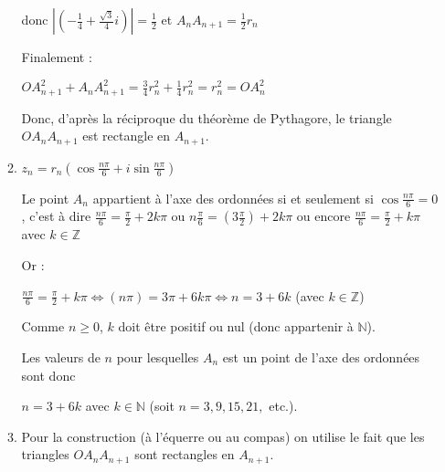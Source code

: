 \begin{corrige}
\begin{enumerate}
\begin{enumerate}[label=\alph*.]
               donc $\left| \left(-\frac{1}{4} + \frac{\sqrt{3}}{4}i\right) \right| = \frac{1}{2}$ et $A_{n}A_{n+1}=\frac{1}{2}r_{n}$
               \par
               Finalement :
               \par
               $ OA_{n+1}^{2} + A_{n}A_{n+1}^{2} = \frac{3}{4}r_{n}^{2}+\frac{1}{4}r_{n}^{2} = r_{n}^{2} = OA_{n}^{2}$
               \par
               Donc, d'après la réciproque du théorème de Pythagore, le triangle $OA_{n}A_{n+1}$ est rectangle en $A_{n+1}$.
               \item
               $z_{n}=r_{n} \left(\cos\frac{n\pi }{6}+i \sin\frac{n\pi }{6}\right)$
               \par
               Le point $A_{n}$ appartient à l'axe des ordonnées si et seulement si $\cos\frac{n\pi }{6} = 0$, c'est à dire $\frac{n\pi }{6}=\frac{\pi }{2}+2k\pi $ ou $n\frac{\pi }{6}=\left(3\frac{\pi }{2}\right)+2k\pi $ ou encore $\frac{n\pi }{6}=\frac{\pi }{2} + k\pi $ avec $k \in  \mathbb{Z}$
               \par
               Or :
               \par
               $\frac{n\pi }{6}=\frac{\pi }{2} + k\pi   \Leftrightarrow  \left(n\pi \right)=3\pi  + 6k\pi    \Leftrightarrow  n= 3 + 6k$  (avec $k \in  \mathbb{Z}$)
               \par
               Comme $n\geqslant 0$, $k$ doit être positif ou nul (donc appartenir à $\mathbb{N}$).
               \par
               Les valeurs de $n$  pour lesquelles $A_{n}$ est un point de l'axe des ordonnées sont donc
               \par
               $n= 3 + 6k$  avec $k \in  \mathbb{N}$ (soit $n = 3, 9, 15, 21,$ etc.).
               \item

\begin{center}
\end{center}
               Pour la construction (à l'équerre ou au compas) on utilise le fait que les triangles $OA_{n}A_{n+1}$ sont rectangles en $A_{n+1}$.
          \end{enumerate}
     \end{enumerate}
\end{corrige}

